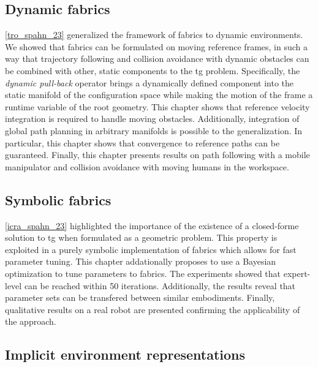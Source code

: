 \subsection{Dynamic fabrics}
\label{sec:conclusion_dynamic_fabrics}

\cref{tro_spahn_23} generalized the framework of \ac{fabrics} to dynamic
environments. We showed that \ac{fabrics} can be formulated on moving reference
frames, in such a way that trajectory following and collision avoidance with
dynamic obstacles can be combined with other, static components to the \ac{tg}
problem. Specifically, the \textit{dynamic pull-back}
operator brings a dynamically defined component into the static manifold of the
configuration space while making the motion of the frame a runtime variable of
the root geometry. This chapter shows that reference velocity integration is
required to handle moving obstacles. Additionally, integration of global path
planning in arbitrary manifolds is possible to the generalization. In
particular, this chapter shows that convergence to reference paths can be 
guaranteed. Finally, this chapter presents results on path following with a
mobile manipulator and collision avoidance with moving humans in the workspace.


\subsection{Symbolic fabrics}
\label{sec:conclusion_symbolic_fabrics}

\cref{icra_spahn_23} highlighted the importance of the existence of a
closed-forme solution to \ac{tg} when formulated as a geometric problem.
This property is exploited in a purely symbolic implementation of \ac{fabrics}
which allows for fast parameter tuning. This chapter addationally
proposes to use a Bayesian optimization to tune parameters to \ac{fabrics}.
The experiments showed that expert-level can be reached within 50 iterations.
Additionally, the results reveal that parameter sets can be transfered between
similar embodiments. Finally, qualitative results on a real robot are presented
confirming the applicability of the approach.

\subsection{Implicit environment representations}
\label{sec:conclusion_implicit}


